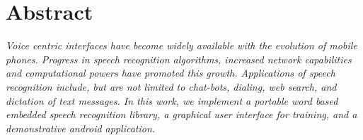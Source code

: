 \newpage
\chapter*{\centering Abstract}

\textit{\quad Voice centric interfaces have become widely available with the evolution of mobile phones. Progress in speech recognition algorithms, increased network capabilities and computational powers have promoted this growth. Applications of speech recognition include, but are not limited to chat-bots, dialing, web search, and dictation of text messages. In this work, we implement a portable word based embedded speech recognition library, a graphical user interface for training, and a demonstrative android application.}